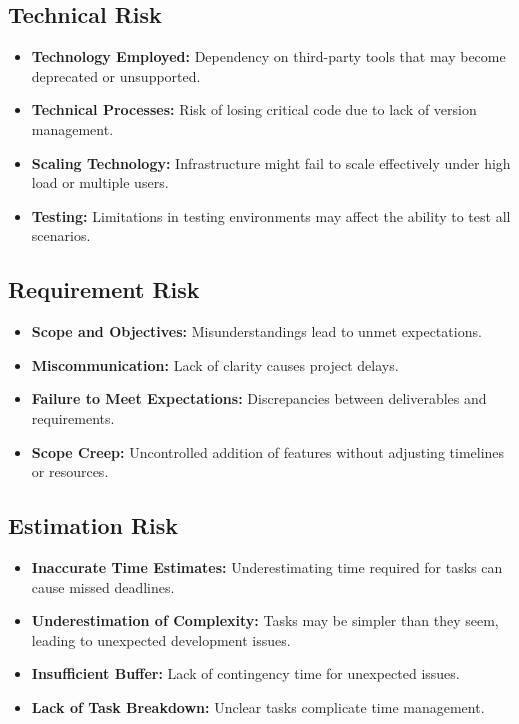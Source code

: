 \documentclass{article}
\begin{document}
\subsection{Technical Risk}
\begin{itemize}
    \item \textbf{Technology Employed:} Dependency on third-party tools that may become deprecated or unsupported.
    \item \textbf{Technical Processes:} Risk of losing critical code due to lack of version management.
    \item \textbf{Scaling Technology:} Infrastructure might fail to scale effectively under high load or multiple users.
    \item \textbf{Testing:} Limitations in testing environments may affect the ability to test all scenarios.
\end{itemize}

\vspace{0.5cm}

\subsection{Requirement Risk}
\begin{itemize}
    \item \textbf{Scope and Objectives:} Misunderstandings lead to unmet expectations.
    \item \textbf{Miscommunication:} Lack of clarity causes project delays.
    \item \textbf{Failure to Meet Expectations:} Discrepancies between deliverables and requirements.
    \item \textbf{Scope Creep:} Uncontrolled addition of features without adjusting timelines or resources.
\end{itemize}

\vspace{0.5cm}

\subsection{Estimation Risk}
\begin{itemize}
    \item \textbf{Inaccurate Time Estimates:} Underestimating time required for tasks can cause missed deadlines.
    \item \textbf{Underestimation of Complexity:} Tasks may be simpler than they seem, leading to unexpected development issues.
    \item \textbf{Insufficient Buffer:} Lack of contingency time for unexpected issues.
    \item \textbf{Lack of Task Breakdown:} Unclear tasks complicate time management.
\end{itemize}
\end{document}
